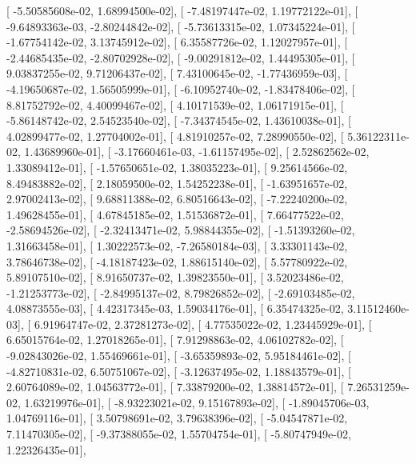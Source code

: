 \documentclass{article}
\begin{document}
       [ -5.50585608e-02,   1.68994500e-02],
       [ -7.48197447e-02,   1.19772122e-01],
       [ -9.64893363e-03,  -2.80244842e-02],
       [ -5.73613315e-02,   1.07345224e-01],
       [ -1.67754142e-02,   3.13745912e-02],
       [  6.35587726e-02,   1.12027957e-01],
       [ -2.44685435e-02,  -2.80702928e-02],
       [ -9.00291812e-02,   1.44495305e-01],
       [  9.03837255e-02,   9.71206437e-02],
       [  7.43100645e-02,  -1.77436959e-03],
       [ -4.19650687e-02,   1.56505999e-01],
       [ -6.10952740e-02,  -1.83478406e-02],
       [  8.81752792e-02,   4.40099467e-02],
       [  4.10171539e-02,   1.06171915e-01],
       [ -5.86148742e-02,   2.54523540e-02],
       [ -7.34374545e-02,   1.43610038e-01],
       [  4.02899477e-02,   1.27704002e-01],
       [  4.81910257e-02,   7.28990550e-02],
       [  5.36122311e-02,   1.43689960e-01],
       [ -3.17660461e-03,  -1.61157495e-02],
       [  2.52862562e-02,   1.33089412e-01],
       [ -1.57650651e-02,   1.38035223e-01],
       [  9.25614566e-02,   8.49483882e-02],
       [  2.18059500e-02,   1.54252238e-01],
       [ -1.63951657e-02,   2.97002413e-02],
       [  9.68811388e-02,   6.80516643e-02],
       [ -7.22240200e-02,   1.49628455e-01],
       [  4.67845185e-02,   1.51536872e-01],
       [  7.66477522e-02,  -2.58694526e-02],
       [ -2.32413471e-02,   5.98844355e-02],
       [ -1.51393260e-02,   1.31663458e-01],
       [  1.30222573e-02,  -7.26580184e-03],
       [  3.33301143e-02,   3.78646738e-02],
       [ -4.18187423e-02,   1.88615140e-02],
       [  5.57780922e-02,   5.89107510e-02],
       [  8.91650737e-02,   1.39823550e-01],
       [  3.52023486e-02,  -1.21253773e-02],
       [ -2.84995137e-02,   8.79826852e-02],
       [ -2.69103485e-02,   4.08873555e-03],
       [  4.42317345e-03,   1.59034176e-01],
       [  6.35474325e-02,   3.11512460e-03],
       [  6.91964747e-02,   2.37281273e-02],
       [  4.77535022e-02,   1.23445929e-01],
       [  6.65015764e-02,   1.27018265e-01],
       [  7.91298863e-02,   4.06102782e-02],
       [ -9.02843026e-02,   1.55469661e-01],
       [ -3.65359893e-02,   5.95184461e-02],
       [ -4.82710831e-02,   6.50751067e-02],
       [ -3.12637495e-02,   1.18843579e-01],
       [  2.60764089e-02,   1.04563772e-01],
       [  7.33879200e-02,   1.38814572e-01],
       [  7.26531259e-02,   1.63219976e-01],
       [ -8.93223021e-02,   9.15167893e-02],
       [ -1.89045706e-03,   1.04769116e-01],
       [  3.50798691e-02,   3.79638396e-02],
       [ -5.04547871e-02,   7.11470305e-02],
       [ -9.37388055e-02,   1.55704754e-01],
       [ -5.80747949e-02,   1.22326435e-01],
\end{document}
